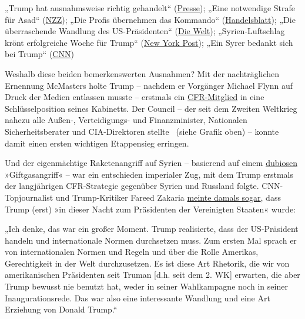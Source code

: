 \begin{itemize}
  „Trump hat ausnahmsweise richtig gehandelt``
  (\href{http://diepresse.com/home/meinung/kommentare/leitartikel/5197748/Leitartikel_Donald-Trump-handelte-ausnahmsweise-einmal-richtig}{Presse});
  „Eine notwendige Strafe für Asad``
  (\href{https://www.nzz.ch/international/militaerschlag-der-usa-in-syrien-eine-notwendige-strafe-fuer-asad-ld.612272}{NZZ});
  „Die Profis übernehmen das Kommando``
  (\href{http://www.handelsblatt.com/politik/international/trump-regierung-die-profis-uebernehmen-das-kommando/19632534.html}{Handelsblatt});
  „Die überraschende Wandlung des US-Präsidenten``
  (\href{https://www.welt.de/politik/ausland/article163496640/Die-ueberraschende-Wandlung-des-US-Praesidenten.html}{Die
  Welt}); „Syrien-Luftschlag krönt erfolgreiche Woche für Trump``
  (\href{http://nypost.com/2017/04/08/airstrike-on-syria-caps-a-successful-week-for-trump/}{New
  York Post}); „Ein Syrer bedankt sich bei Trump``
  (\href{http://www.cnn.com/videos/world/2017/04/07/syrian-survivor-thanks-trump-nr.cnn}{CNN})
\end{itemize}

Weshalb diese beiden bemerkenswerten Ausnahmen? Mit der nachträglichen
Ernennung McMasters holte Trump -- nachdem er Vorgänger Michael Flynn
auf Druck der Medien entlassen musste -- erstmals ein
\href{https://swprs.files.wordpress.com/2017/07/cfr-members-2016.pdf}{CFR-Mitglied}
in eine Schlüsselposition seines Kabinetts. Der Council -- der seit dem
Zweiten Weltkrieg nahezu alle Außen-, Verteidigungs- und Finanzminister,
Nationalen Sicherheitsberater und CIA-Direktoren stellte~ (siehe Grafik
oben) -- konnte damit einen ersten wichtigen Etappensieg erringen.

Und der eigenmächtige Raketenangriff auf Syrien -- basierend auf einem
\href{https://consortiumnews.com/2017/04/05/another-dangerous-rush-to-judgment-in-syria/}{dubiosen}
»Giftgasangriff« -- war ein entschieden imperialer Zug, mit dem Trump
erstmals der langjährigen CFR-Strategie gegenüber Syrien und Russland
folgte. CNN-Topjournalist und Trump-Kritiker Fareed Zakaria
\href{http://www.washingtontimes.com/news/2017/apr/7/fareed-zakaria-donald-trump-became-president-last-/}{meinte
damals sogar}, dass Trump (erst) »in dieser Nacht zum Präsidenten der
Vereinigten Staaten« wurde:

„Ich denke, das war ein großer Moment. Trump realisierte, dass der
US-Präsident handeln und internationale Normen durchsetzen muss. Zum
ersten Mal sprach er von internationalen Normen und Regeln und über die
Rolle Amerikas, Gerechtigkeit in der Welt durchzusetzen. Es ist diese
Art Rhetorik, die wir von amerikanischen Präsidenten seit Truman {[}d.h.
seit dem 2. WK{]} erwarten, die aber Trump bewusst nie benutzt hat,
weder in seiner Wahlkampagne noch in seiner Inaugurationsrede. Das war
also eine interessante Wandlung und eine Art Erziehung von Donald
Trump.``

